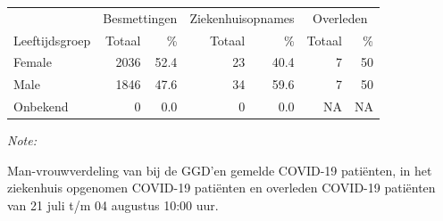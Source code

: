 \documentclass[
  english,
  man,floatsintext]{apa6}
\begin{document}
\begin{table}[H]
\centering\begingroup\fontsize{11}{13}\selectfont

\begin{threeparttable}
\begin{tabular}{lrrrrrr}
\toprule
\multicolumn{1}{c}{ } & \multicolumn{2}{c}{Besmettingen} & \multicolumn{2}{c}{Ziekenhuisopnames} & \multicolumn{2}{c}{Overleden} \\
\cmidrule(l{3pt}r{3pt}){2-3} \cmidrule(l{3pt}r{3pt}){4-5} \cmidrule(l{3pt}r{3pt}){6-7}
Leeftijdsgroep & Totaal & \% & Totaal & \% & Totaal & \%\\
\midrule
Female & 2036 & 52.4 & 23 & 40.4 & 7 & 50\\
Male & 1846 & 47.6 & 34 & 59.6 & 7 & 50\\
Onbekend & 0 & 0.0 & 0 & 0.0 & NA & NA\\
\bottomrule
\end{tabular}
\begin{tablenotes}
\item \textit{Note: } 
\item Man-vrouwverdeling van bij de GGD’en gemelde COVID-19 patiënten, in het ziekenhuis opgenomen COVID-19 patiënten en overleden COVID-19 patiënten van 21 juli t/m 04 augustus 10:00 uur.
\end{tablenotes}
\end{threeparttable}
\endgroup{}
\end{table}
\newpage
\end{document}

